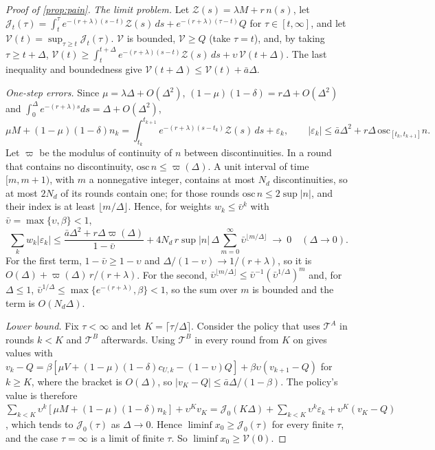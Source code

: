 \begin{proof}[Proof of \cref{prop:pain}]
\emph{The limit problem.} Let $\mathcal Z(s)=\lambda M+r\,n(s)$, let $\mathcal J_t(\tau)=\int_t^\tau e^{-(r+\lambda)(s-t)}\mathcal Z(s)\,ds+e^{-(r+\lambda)(\tau-t)}Q$ for $\tau\in[t,\infty]$, and let $\mathcal V(t)=\sup_{\tau\ge t}\mathcal J_t(\tau)$. $\mathcal V$ is bounded, $\mathcal V\ge Q$ (take $\tau=t$), and, by taking $\tau\ge t+\Delta$, $\mathcal V(t)\ge\int_t^{t+\Delta}e^{-(r+\lambda)(s-t)}\mathcal Z(s)\,ds+\upsilon\,\mathcal V(t+\Delta)$. The last inequality and boundedness give $\mathcal V(t+\Delta)\le\mathcal V(t)+\bar a\Delta$.

\emph{One-step errors.} Since $\mu=\lambda\Delta+O(\Delta^2)$, $(1-\mu)(1-\delta)=r\Delta+O(\Delta^2)$ and $\int_0^\Delta e^{-(r+\lambda)s}ds=\Delta+O(\Delta^2)$,
\[
\mu M+(1-\mu)(1-\delta)n_k=\int_{t_k}^{t_{k+1}}e^{-(r+\lambda)(s-t_k)}\mathcal Z(s)\,ds+\varepsilon_k,\qquad |\varepsilon_k|\le\bar a\Delta^2+r\Delta\,\mathrm{osc}_{[t_k,t_{k+1}]}n .
\]
Let $\varpi$ be the modulus of continuity of $n$ between discontinuities. In a round that contains no discontinuity, $\mathrm{osc}\,n\le\varpi(\Delta)$. A unit interval of time $[m,m+1)$, with $m$ a nonnegative integer, contains at most $N_d$ discontinuities, so at most $2N_d$ of its rounds contain one; for those rounds $\mathrm{osc}\,n\le 2\sup|n|$, and their index is at least $\lfloor m/\Delta\rfloor$. Hence, for weights $w_k\le\bar\upsilon^k$ with $\bar\upsilon=\max\{\upsilon,\beta\}<1$,
\[
\sum_k w_k|\varepsilon_k|\le\frac{\bar a\Delta^2+r\Delta\varpi(\Delta)}{1-\bar\upsilon}+4N_d\,r\sup|n|\,\Delta\sum_{m=0}^\infty\bar\upsilon^{\lfloor m/\Delta\rfloor}\ \longrightarrow\ 0\quad(\Delta\to 0).
\]
For the first term, $1-\bar\upsilon\ge 1-\upsilon$ and $\Delta/(1-\upsilon)\to 1/(r+\lambda)$, so it is $O(\Delta)+\varpi(\Delta)\,r/(r+\lambda)$. For the second, $\bar\upsilon^{\lfloor m/\Delta\rfloor}\le\bar\upsilon^{-1}(\bar\upsilon^{1/\Delta})^m$ and, for $\Delta\le 1$, $\bar\upsilon^{1/\Delta}\le\max\{e^{-(r+\lambda)},\beta\}<1$, so the sum over $m$ is bounded and the term is $O(N_d\Delta)$.

\emph{Lower bound.} Fix $\tau<\infty$ and let $K=\lceil\tau/\Delta\rceil$. Consider the policy that uses $\mathcal T^A$ in rounds $k<K$ and $\mathcal T^B$ afterwards. Using $\mathcal T^B$ in every round from $K$ on gives values with $v_k-Q=\beta[\mu V+(1-\mu)(1-\delta)c_{U,k}-(1-\upsilon)Q]+\beta\upsilon(v_{k+1}-Q)$ for $k\ge K$, where the bracket is $O(\Delta)$, so $|v_K-Q|\le\bar a\Delta/(1-\beta)$. The policy's value is therefore $\sum_{k<K}\upsilon^k[\mu M+(1-\mu)(1-\delta)n_k]+\upsilon^Kv_K=\mathcal J_0(K\Delta)+\sum_{k<K}\upsilon^k\varepsilon_k+\upsilon^K(v_K-Q)$, which tends to $\mathcal J_0(\tau)$ as $\Delta\to 0$. Hence $\liminf x_0\ge\mathcal J_0(\tau)$ for every finite $\tau$, and the case $\tau=\infty$ is a limit of finite $\tau$. So $\liminf x_0\ge\mathcal V(0)$.


\end{proof}
